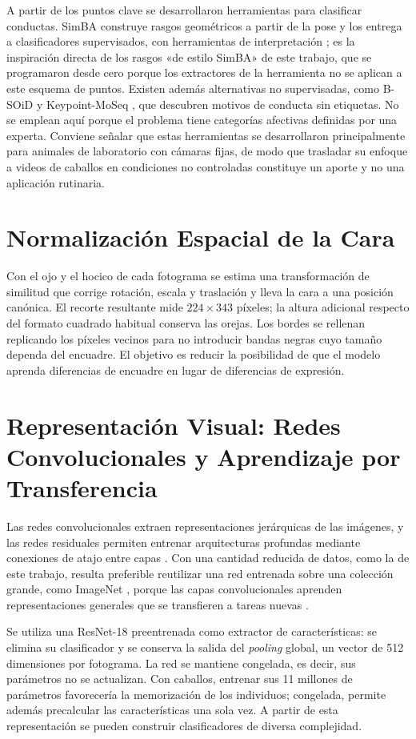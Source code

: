 A partir de los puntos clave se desarrollaron herramientas para clasificar conductas. SimBA construye rasgos geométricos a partir de la pose y los entrega a clasificadores supervisados, con herramientas de interpretación \parencite{goodwin2024}; es la inspiración directa de los \PoseRasgos{} rasgos «de estilo SimBA» de este trabajo, que se programaron desde cero porque los extractores de la herramienta no se aplican a este esquema de puntos. Existen además alternativas no supervisadas, como B-SOiD \parencite{hsu2021} y Keypoint-MoSeq \parencite{weinreb2024}, que descubren motivos de conducta sin etiquetas. No se emplean aquí porque el problema tiene categorías afectivas definidas por una experta. Conviene señalar que estas herramientas se desarrollaron principalmente para animales de laboratorio con cámaras fijas, de modo que trasladar su enfoque a videos de caballos en condiciones no controladas constituye un aporte y no una aplicación rutinaria.

\section{Normalización Espacial de la Cara}
Con el ojo y el hocico de cada fotograma se estima una transformación de similitud que corrige rotación, escala y traslación y lleva la cara a una posición canónica. El recorte resultante mide $224 \times 343$ píxeles; la altura adicional respecto del formato cuadrado habitual conserva las orejas. Los bordes se rellenan replicando los píxeles vecinos para no introducir bandas negras cuyo tamaño dependa del encuadre. El objetivo es reducir la posibilidad de que el modelo aprenda diferencias de encuadre en lugar de diferencias de expresión.

\section{Representación Visual: Redes Convolucionales y Aprendizaje por Transferencia}
Las redes convolucionales extraen representaciones jerárquicas de las imágenes, y las redes residuales permiten entrenar arquitecturas profundas mediante conexiones de atajo entre capas \parencite{he2016}. Con una cantidad reducida de datos, como la de este trabajo, resulta preferible reutilizar una red entrenada sobre una colección grande, como ImageNet \parencite{deng2009}, porque las capas convolucionales aprenden representaciones generales que se transfieren a tareas nuevas \parencite{yosinski2014}.

Se utiliza una ResNet-18 preentrenada como extractor de características: se elimina su clasificador y se conserva la salida del \textit{pooling} global, un vector de 512 dimensiones por fotograma. La red se mantiene congelada, es decir, sus parámetros no se actualizan. Con \CaballosTotal{} caballos, entrenar sus 11 millones de parámetros favorecería la memorización de los individuos; congelada, permite además precalcular las características una sola vez. A partir de esta representación se pueden construir clasificadores de diversa complejidad.


